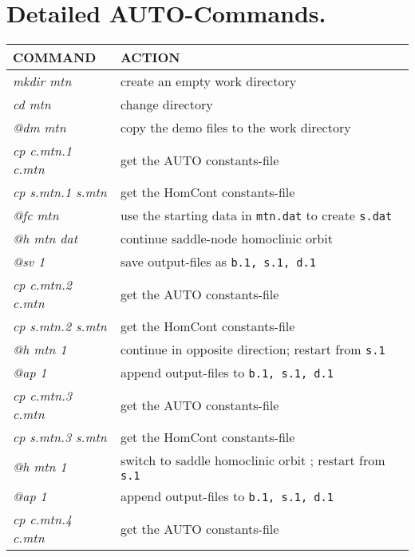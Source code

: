 \documentclass[12pt]{report}
\begin{document}
\section{ Detailed {\cal AUTO}-Commands.}
\begin{table}[htbp]
\begin{center}
\begin{tabular}{| l | l |}
\hline
  COMMAND  & ACTION \\
\hline
  {\it mkdir mtn} & create an empty work directory \\ 
  {\it cd mtn} & change directory \\
  {\it @dm mtn} & copy the demo files to the work directory \\
\hline
  {\it cp c.mtn.1 c.mtn} & get the AUTO constants-file \\ 
  {\it cp s.mtn.1 s.mtn} & get the HomCont constants-file \\ 
  {\it @fc mtn} & use the starting data in {\tt mtn.dat} to create {\tt s.dat} \\ 
  {\it @h mtn dat} &  continue saddle-node homoclinic orbit\\
  {\it @sv 1} & save output-files as {\tt b.1, s.1, d.1} \\ 
\hline
  {\it cp c.mtn.2 c.mtn} & get the AUTO constants-file \\ 
  {\it cp s.mtn.2 s.mtn} & get the HomCont constants-file \\ 
  {\it @h mtn 1} & continue in opposite direction; restart from {\tt s.1} \\ 
  {\it @ap 1} & append output-files to {\tt b.1, s.1, d.1} \\ 
\hline
  {\it cp c.mtn.3 c.mtn} & get the AUTO constants-file \\ 
  {\it cp s.mtn.3 s.mtn} & get the HomCont constants-file \\ 
  {\it @h mtn 1} & switch to saddle homoclinic orbit  ; restart from {\tt s.1} \\ 
  {\it @ap 1} & append output-files to {\tt b.1, s.1, d.1} \\ 
\hline
  {\it cp c.mtn.4 c.mtn} & get the AUTO constants-file \\ 

\end{tabular}
\end{center}
\end{table}
\end{document}
